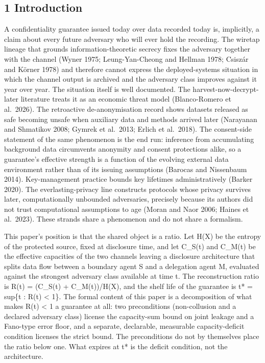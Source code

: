 \documentclass[
]{llncs}
\begin{document}
\subsection{1 Introduction}\label{introduction}

A confidentiality guarantee issued today over data recorded today is,
implicitly, a claim about every future adversary who will ever hold the
recording. The wiretap lineage that grounds information-theoretic
secrecy fixes the adversary together with the channel (Wyner 1975;
Leung-Yan-Cheong and Hellman 1978; Csiszár and Körner 1978) and
therefore cannot express the deployed-systems situation in which the
channel output is archived and the adversary class improves against it
year over year. The situation itself is well documented. The
harvest-now-decrypt-later literature treats it as an economic threat
model (Blanco-Romero et al.~2026). The retroactive de-anonymisation
record shows datasets released as safe becoming unsafe when auxiliary
data and methods arrived later (Narayanan and Shmatikov 2008; Gymrek et
al.~2013; Erlich et al.~2018). The consent-side statement of the same
phenomenon is the end run: inference from accumulating background data
circumvents anonymity and consent protections alike, so a guarantee's
effective strength is a function of the evolving external data
environment rather than of its issuing assumptions (Barocas and
Nissenbaum 2014). Key-management practice bounds key lifetimes
administratively (Barker 2020). The everlasting-privacy line constructs
protocols whose privacy survives later, computationally unbounded
adversaries, precisely because its authors did not trust computational
assumptions to age (Moran and Naor 2006; Haines et al.~2023). These
strands share a phenomenon and do not share a formalism.

This paper's position is that the shared object is a ratio. Let H(X) be
the entropy of the protected source, fixed at disclosure time, and let
C\_S(t) and C\_M(t) be the effective capacities of the two channels
leaving a disclosure architecture that splits data flow between a
boundary agent S and a delegation agent M, evaluated against the
strongest adversary class available at time t. The reconstruction ratio
is R(t) = (C\_S(t) + C\_M(t))/H(X), and the shelf life of the guarantee
is t* = sup\{t : R(t) \textless{} 1\}. The formal content of this paper
is a decomposition of what makes R(t) \textless{} 1 a guarantee at all:
two preconditions (non-collusion and a declared adversary class) license
the capacity-sum bound on joint leakage and a Fano-type error floor, and
a separate, declarable, measurable capacity-deficit condition licenses
the strict bound. The preconditions do not by themselves place the ratio
below one. What expires at t* is the deficit condition, not the
architecture.
\end{document}

